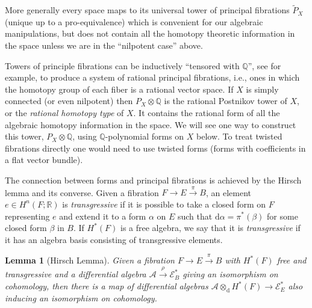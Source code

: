 \documentclass[11pt]{amsart}
\theoremstyle{plain}
\newtheorem{lemma}[theorem]{Lemma}
\theoremstyle{definition}
\newcommand{\sA}{\mathscr{A}}
\newcommand{\sE}{\mathscr{E}}
\newcommand{\dd}{\mathrm{d}}
\newcommand{\RR}{\mathbb{R}}
\newcommand{\QQ}{\mathbb{Q}}
\begin{document}
More generally every space maps to its universal tower of principal fibrations $\tilde{P}_{X}$ (unique up to a pro-equivalence) which is convenient for our algebraic manipulations, but does not contain all the homotopy theoretic information in the space unless we are in the ``nilpotent case'' above.

Towers of principle fibrations can be inductively ``tensored with $\QQ$'', see \cite{S2} for example, to produce a system of rational principal fibrations, i.e., ones in which the homotopy group of each fiber is a rational vector space. If $X$ is simply connected (or even nilpotent) then $P_{X} \otimes \QQ$ is the rational Postnikov tower of $X$, or the \emph{rational homotopy type} of $X$. It contains the rational form of all the algebraic homotopy information in the space. We will see one way to construct this tower, $P_{X} \otimes \QQ$, using $\QQ$-polynomial forms on $X$ below. To treat twisted fibrations directly one would need to use twisted forms (forms with coefficients in a flat vector bundle).

The connection between forms and principal fibrations is achieved by the Hirsch lemma and its converse. Given a fibration $F \to E \xrightarrow{\pi} B$, an element $e \in H^{n}(F; \RR)$ is \emph{transgressive} if it is possible to take a closed form on $F$ representing $e$ and extend it to a form $\alpha$ on $E$ such that $\dd\alpha = \pi^{*}(\beta)$ for some closed form $\beta$ in $B$. If $H^{*}(F)$ is a free algebra, we say that it is \emph{transgressive} if it has an algebra basis consisting of transgressive elements.

\begin{lemma}[Hirsch Lemma]\label{lem:3.1}
Given a fibration $F \to E \xrightarrow{\pi} B$ with $H^{*}(F)$ free and transgressive and a differential algebra $\sA \xrightarrow{\rho} \sE^{*}_{B}$ giving an isomorphism on cohomology, then there is a map of differential algebras $\sA \otimes_{\dd} H^{*}(F) \to \sE^{*}_{E}$ also inducing an isomorphism on cohomology.
\end{lemma}
\end{document}
